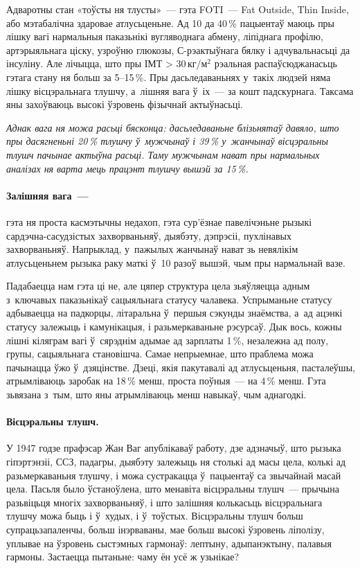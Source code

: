Адваротны стан «тоўсты ня тлусты»~--- гэта FOTI~--- Fat Outside, Thin Inside, або мэтабалічна здаровае атлусьценьне. Ад 10 да 40\,\% пацыентаў маюць пры лішку вагі нармальныя паказьнікі вугляводнага абмену, ліпіднага профілю, артэрыяльнага ціску, узроўню глюкозы, С-рэактыўнага бялку і адчувальнасьці да інсуліну. Але лічыцца, што пры ІМТ > 30\,кг/м${}^2$ рэальная распаўсюджанасьць гэтага стану ня больш за 5--15\,\%. Пры дасьледаваньнях у~такіх людзей няма лішку вісцэральнага тлушчу, а~лішняя вага ў~іх~--- за кошт падскурнага. Таксама яны захоўваюць высокі ўзровень фізычнай актыўнасьці.

\emph{Аднак вага ня можа расьці бясконца: дасьледаваньне блізьнятаў давяло, што пры дасягненьні 20\,\% тлушчу ў~мужчынаў і 39\,\% у~жанчынаў вісцэральны тлушч пачынае актыўна расьці. Таму мужчынам нават пры нармальных аналізах ня варта мець працэнт тлушчу вышэй за 15\,\%.}

\paragraph{Залішняя вага~---} гэта ня проста касмэтычны недахоп, гэта сур'ёзнае павелічэньне рызыкі сардэчна-сасудзістых захворваньняў, дыябэту, дэпрэсіі, пухлінавых захворваньняў. Напрыклад, у~пажылых жанчынаў нават зь невялікім атлусьценьнем рызыка раку маткі ў~10 разоў вышэй, чым пры нармальнай вазе. 


Падабаецца нам гэта ці не, але цяпер структура цела зьяўляецца адным з~ключавых паказьнікаў сацыяльнага статусу чалавека. Успрыманьне статусу адбываецца на падкорцы, літаральна ў~першыя сэкунды знаёмства, а~ад ацэнкі статусу залежыць і камунікацыя, і разьмеркаваньне рэсурсаў. Дык вось, кожны лішні кіляграм вагі ў~сярэднім адымае ад зарплаты 1\,\%, незалежна ад полу, групы, сацыяльнага становішча. Самае непрыемнае, што праблема можа пачынацца ўжо ў~дзяцінстве. Дзеці, якія пакутавалі ад атлусьценьня, пасталеўшы, атрымліваюць заробак на 18\,\% менш, проста поўныя~--- на 4\,\% менш. Гэта зьвязана з~тым, што яны атрымліваюць менш навыкаў, чым аднагодкі.

\paragraph{Вісцэральны тлушч.} У 1947 годзе прафэсар Жан Ваг апублікаваў работу, дзе адзначыў, што рызыка гіпэртэнзіі, ССЗ, падагры, дыябэту залежыць ня столькі ад масы цела, колькі ад разьмеркаваньня тлушчу, і можа сустракацца ў~пацыентаў са звычайнай масай цела. Пасьля было ўстаноўлена, што менавіта вісцэральны тлушч~--- прычына разьвіцьця многіх захворваньняў, і што залішняя колькасьць вісцэральнага тлушчу можа быць і ў~худых, і ў~тоўстых. Вісцэральны тлушч больш супрацьзапаленчы, больш інэрваваны, мае больш высокі ўзровень ліполізу, уплывае на ўзровень сыстэмных гармонаў: лептыну, адыпанэктыну, палавыя гармоны. Застаецца пытаньне: чаму ён усё ж узьнікае?

